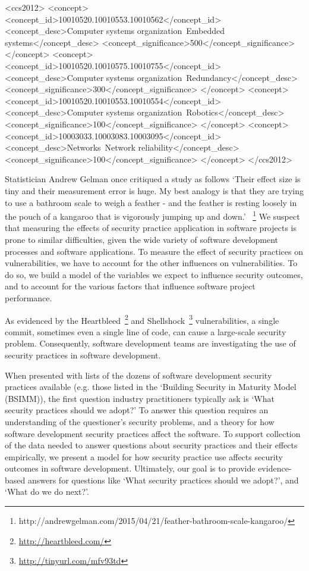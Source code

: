 %
%
\begin{CCSXML}
	<ccs2012>
	<concept>
	<concept_id>10010520.10010553.10010562</concept_id>
	<concept_desc>Computer systems organization~Embedded systems</concept_desc>
	<concept_significance>500</concept_significance>
	</concept>
	<concept>
	<concept_id>10010520.10010575.10010755</concept_id>
	<concept_desc>Computer systems organization~Redundancy</concept_desc>
	<concept_significance>300</concept_significance>
	</concept>
	<concept>
	<concept_id>10010520.10010553.10010554</concept_id>
	<concept_desc>Computer systems organization~Robotics</concept_desc>
	<concept_significance>100</concept_significance>
	</concept>
	<concept>
	<concept_id>10003033.10003083.10003095</concept_id>
	<concept_desc>Networks~Network reliability</concept_desc>
	<concept_significance>100</concept_significance>
	</concept>
	</ccs2012>  
\end{CCSXML}



Statistician Andrew Gelman once critiqued a study as follows `Their effect size is tiny and their measurement error is huge. My best analogy is that they are trying to use a bathroom scale to weigh a feather - and the feather is resting loosely in the pouch of a kangaroo that is vigorously jumping up and down.' ~\footnote{http://andrewgelman.com/2015/04/21/feather-bathroom-scale-kangaroo/} We suspect that measuring the effects of security practice application in software projects is prone to similar difficulties, given the wide variety of software development processes and software applications. To measure the effect of security practices on vulnerabilities, we have to account for the other influences on vulnerabilities. To do so, we build a model of the variables we expect to influence security outcomes, and to account for the various factors that influence software project performance.


As evidenced by the Heartbleed~\footnote{\url{http://heartbleed.com/}} and Shellshock~\footnote{\url{http://tinyurl.com/mfv93td}} vulnerabilities, a single commit, sometimes even a single line of code, can cause a large-scale security problem.  Consequently, software development teams are investigating the use of security practices in software development.

 When presented with lists of the dozens of software development security practices available (e.g. those listed in the `Building Security in Maturity Model ~\cite{mcgraw2013bsimm} (BSIMM)), the first question industry practitioners typically ask is `What security practices should we  adopt?'  To answer this question requires an understanding of the questioner's security problems, and a theory for how software development security practices affect the software. To support collection of the data needed to answer questions about security practices and their effects empirically, we present a model for how security practice use affects security outcomes in software development.  Ultimately, our goal is to provide evidence-based answers for questions like `What security practices should we adopt?', and `What do we do next?'.
 
